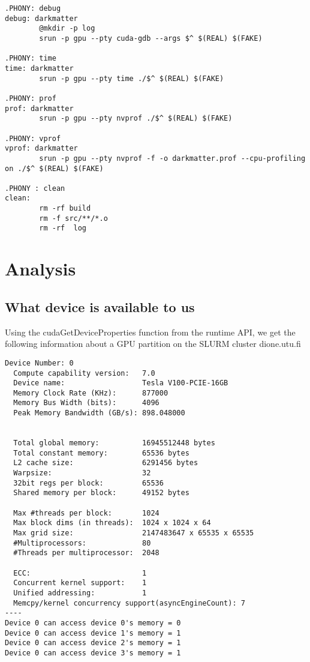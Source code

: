 \documentclass[a4paper,titlepage,12pt]{article}
\begin{document}
\begin{description}[left = \parindent]
\begin{lstlisting}[caption=the project makefile]
.PHONY: debug
debug: darkmatter
        @mkdir -p log
        srun -p gpu --pty cuda-gdb --args $^ $(REAL) $(FAKE)

.PHONY: time
time: darkmatter
        srun -p gpu --pty time ./$^ $(REAL) $(FAKE)

.PHONY: prof
prof: darkmatter
        srun -p gpu --pty nvprof ./$^ $(REAL) $(FAKE)
        
.PHONY: vprof
vprof: darkmatter
        srun -p gpu --pty nvprof -f -o darkmatter.prof --cpu-profiling on ./$^ $(REAL) $(FAKE)

.PHONY : clean
clean: 
        rm -rf build
        rm -f src/**/*.o
        rm -rf  log
\end{lstlisting}

%
\section{Analysis}

\subsection{What device is available to us}
Using the cudaGetDeviceProperties function from the runtime API, we get the following information about a GPU partition on the SLURM cluster dione.utu.fi
\begin{verbatim}
Device Number: 0
  Compute capability version:   7.0
  Device name:                  Tesla V100-PCIE-16GB
  Memory Clock Rate (KHz):      877000
  Memory Bus Width (bits):      4096
  Peak Memory Bandwidth (GB/s): 898.048000


  Total global memory:          16945512448 bytes
  Total constant memory:        65536 bytes
  L2 cache size:                6291456 bytes
  Warpsize:                     32
  32bit regs per block:         65536
  Shared memory per block:      49152 bytes

  Max #threads per block:       1024
  Max block dims (in threads):  1024 x 1024 x 64
  Max grid size:                2147483647 x 65535 x 65535
  #Multiprocessors:             80
  #Threads per multiprocessor:  2048

  ECC:                          1
  Concurrent kernel support:    1
  Unified addressing:           1
  Memcpy/kernel concurrency support(asyncEngineCount): 7
----
Device 0 can access device 0's memory = 0
Device 0 can access device 1's memory = 1
Device 0 can access device 2's memory = 1
Device 0 can access device 3's memory = 1
\end{verbatim}


\end{description}
\end{document}

